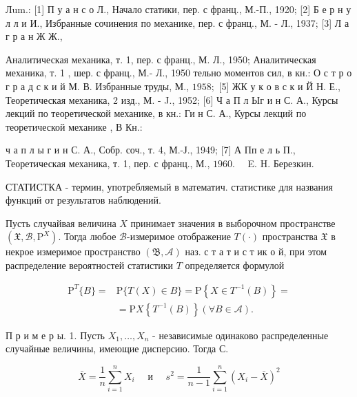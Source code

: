 \documentclass[10pt]{article}
\begin{document}
Лum.: [1] П у а н с о Л., Начало статики, пер. с франц., М.-П., 1920; [2] Б е р н у л л и И., Избранные сочинения по механике, пер. с франц., М. - Л., 1937; [3] Л а г р а н Ж Ж.,

Аналитическая механика, т. 1, пер. с франц., М. Л., 1950; Аналитическая механика, т. 1 , шер. с франц., М.- Л., 1950 тельно моментов сил, в кн.: О с т р о г р а д с к и й М. В. Избранные труды, М., $1958 ;$ [5] ЖК у к о в с к и Й Н. Е., Теоретическая механика, 2 изд., М. - J., 1952; [6] Ч а П л Ыг и н С. А., Курсы лекций по теоретической механике, в кн.: Ги н С. А., Курсы лекций по теоретической механике , В Кн.:

ч а п л ы г и н С. А., Собр. соч., т. 4, М.-Ј., 1949; [7] А Пп е л ь П., Теоретическая механика, т. 1, пер. с франц., М., $1960 . \quad$ E. H. Березкин.



СТАТИСТКА - термин, употребляемый в математич. статистике для названия функций от результатов наблюдений.



Пусть случайвая величина $X$ принимает значения в выборочном пространстве $\left(\mathfrak{X}, \mathscr{B}, \mathrm{P}^{X}\right)$. Тогда любое $\mathscr{B}$-измеримое отображение $T(\cdot)$ пространства $\mathfrak{X}$ в некрое измеримое пространство $(\mathfrak{B}, \mathcal{A})$ наз. с т а т и с т ик о й, при этом распределение вероятностей статистики $T$ определяется формулой



\[

\begin{aligned}

\mathrm{P}^{T}\{B\}= & \mathrm{P}\{T(X) \in B\}=\mathrm{P}\left\{X \in T^{-1}(B)\right\}= \\

& =\mathrm{P} X\left\{T^{-1}(B)\right\}(\forall B \in \mathcal{A}) .

\end{aligned}

\]



П р и м е р ы. 1. Пусть $X_{1}, \ldots, X_{n}$ - независимые одинаково распределенные случайные величины, имеющие дисперсию. Тогда С.



\[

\bar{X}=\frac{1}{n} \sum_{i=1}^{n} X_{i} \quad \text { и } \quad s^{2}=\frac{1}{n-1} \sum_{i=1}^{n}\left(X_{i}-\bar{X}\right)^{2}

\]
\end{document}
